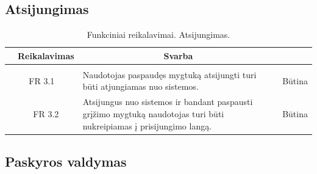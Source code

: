 \documentclass{VUMIFPSkursinis}
\begin{document}
\subsection{Atsijungimas}

	\begin{table}[H]
	\caption{Funkciniai reikalavimai. Atsijungimas.}
	\begin{tabular}{|p{1cm}|p{1cm}|p{}|p{}|}
		\hline 
		\rowcolor{gray!50}
		\multicolumn{2}{|c|}{{\bfseries Kodas}}&
		\multicolumn{1}{c|}{{\bfseries Reikalavimas}}&
		\multicolumn{1}{c|}{{\bfseries Svarba}}\\
		\hline
		\rowcolor{lightgray}
		\multicolumn{4}{|c|}{Atsijungimas}\\		
		
		\hline
		\multicolumn{2}{|c|}{FR 3.1}&
		{Naudotojas paspaudęs mygtuką atsijungti turi būti atjungiamas nuo sistemos.
		}&		
		\multicolumn{1}{c|}{Būtina}\\
		\hline
		\multicolumn{1}{|c}{}&
		\multicolumn{1}{c|}{FR 3.2}&
		{Atsijungus nuo sistemos ir bandant paspausti grįžimo mygtuką naudotojas turi būti nukreipiamas į prisijungimo langą.
		}&		
		\multicolumn{1}{c|}{Būtina}\\
		\hline
	\end{tabular}		
\end{table}

\subsection{Paskyros valdymas}
\end{document}

